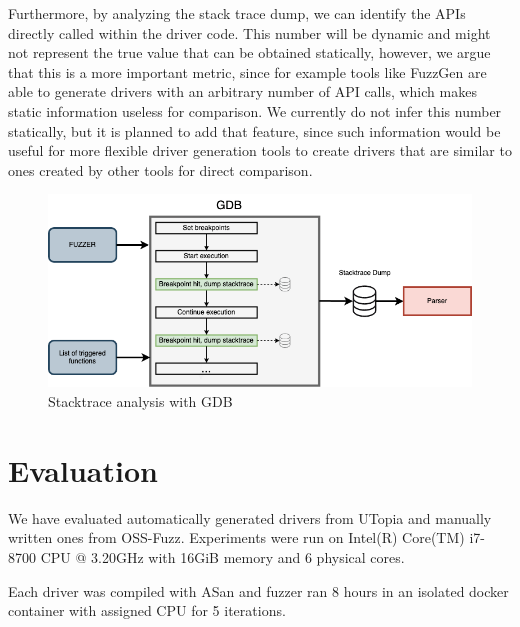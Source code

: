 \documentclass[a4paper,11pt,oneside]{report}
\begin{document}
Furthermore, by analyzing the stack trace dump, we can identify the 
APIs directly called within the driver code. 
This number will be dynamic and might not
represent the true value that can be obtained statically, however, we
argue that this is a more important metric, since for example tools
like FuzzGen are able to generate drivers with an arbitrary number of 
API calls, which makes static information useless for comparison. 
We currently do not infer this number statically, but it is planned 
to add that feature, since such information would be useful for
more flexible driver generation tools to create drivers that are 
similar to ones created by other tools for direct comparison. 




\begin{figure}[htb]
	\centering
	\includegraphics[width=16cm]{figures/stacktrace.png}
	\caption{Stacktrace analysis with GDB}
	\label{fig:stacktrace}
\end{figure}





\chapter{Evaluation}

We have evaluated automatically generated drivers from UTopia and manually 
written ones from OSS-Fuzz. Experiments were run on Intel(R) Core(TM) i7-8700 CPU @ 3.20GHz 
with 16GiB memory and 6 physical cores. 

Each driver was compiled with ASan and fuzzer ran 8 hours in an isolated docker container 
with assigned CPU for 5 iterations. 
\end{document}
